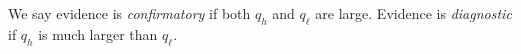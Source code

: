 \documentclass[
    preview, 
    varwidth=10cm, 
    border={0pt 1pt 1pt 1pt}
    ]{standalone} %
\begin{document}
    We say evidence is \emph{confirmatory} if both \(q_h\) and \(q_\ell\) are large.
    Evidence is \emph{diagnostic} if \(q_h\) is much larger than \(q_\ell\).




    

\end{document}
